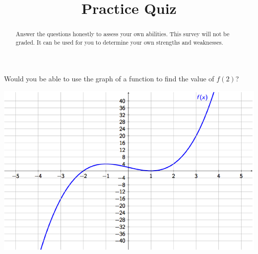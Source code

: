 \documentclass{ximera}
\title{Practice Quiz}
\begin{document}
\begin{abstract}
Answer the questions honestly to assess your own abilities. This survey will not be graded. It can be used for you to determine your own strengths and weaknesses.
\end{abstract}
\maketitle

\begin{problem} 
    Would you be able to use the graph of a function to find the value of $f(2)$?
    
    \begin{center} \includegraphics[scale=0.7]{Graphing1.png} \end{center}

  \begin{multipleChoice}
  \end{multipleChoice}
\end{problem}
\end{document}
